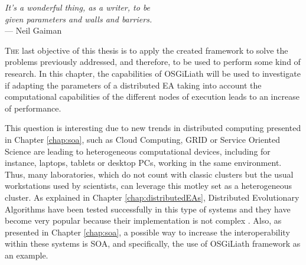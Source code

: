 \label{chap:adaptive}



\begin{flushright}{\slshape
    It's a wonderful thing, as a writer, to be 
    \\given parameters and walls and barriers.} \\ \medskip
    --- {Neil Gaiman}
\end{flushright}

\minitoc\mtcskip
\vfill
\lettrine{T}{he} last objective of this thesis is to apply the created framework to solve the problems previously addressed, and therefore, to be used to perform some kind of research. In this chapter, the capabilities of OSGiLiath will be used to investigate if adapting the parameters of a distributed EA taking into account the computational capabilities of the different nodes of execution leads to an increase of performance.

This question is interesting due to new trends in distributed computing presented in Chapter \ref{chap:soa}, such as Cloud Computing, GRID
 or Service Oriented Science
 are %
leading to heterogeneous computational devices, including for instance, laptops,
tablets or desktop PCs, working in the same
environment. Thus, many laboratories, which do not count with classic
clusters but the usual workstations used by scientists, can leverage
this motley set as a heterogeneous cluster. As explained in Chapter \ref{chap:distributedEAs}, Distributed Evolutionary
Algorithms have been tested successfully in this type of systems and they have 
become very popular because their implementation is
not complex \cite{AsynchronousMultidemeMerelo08}. %
Also, as presented in Chapter \ref{chap:soa}, a possible way to increase 
the interoperability within these systems is SOA, and specifically, the use of OSGiLiath framework as an example.


